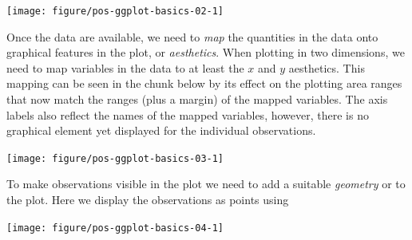 \documentclass[krantz2]{krantz}\usepackage{knitr}%
\begin{document}
\begin{knitrout}\footnotesize
{}\color{fgcolor}\begin{kframe}
\begin{alltt}
\hlstd{(} 
\end{alltt}
\end{kframe}

{\centering \texttt{[image: figure/pos-ggplot-basics-02-1]} 

}



\end{knitrout}

Once the data are available, we need to \emph{map} the quantities in the data onto graphical features in the plot, or \emph{aesthetics}. When plotting in two dimensions, we need to map variables in the data to at least the $x$ and $y$ aesthetics. This mapping can be seen in the chunk below by its effect on the plotting area ranges that now match the ranges (plus a margin) of the mapped variables. The axis labels also reflect the names of the mapped variables, however, there is no graphical element yet displayed for the individual observations.

\begin{knitrout}\footnotesize
{}\color{fgcolor}\begin{kframe}
\begin{alltt}
\hlstd{(} 
       \hlstd{(}   
\end{alltt}
\end{kframe}

{\centering \texttt{[image: figure/pos-ggplot-basics-03-1]} 

}



\end{knitrout}

To make observations visible in the plot we need to add a suitable \emph{geometry} or  to the plot. Here we display the observations as points using 

\begin{knitrout}\footnotesize
{}\color{fgcolor}\begin{kframe}
\begin{alltt}
\hlstd{(} 
       \hlstd{(}    \hlopt{+}
  \hlstd{()}
\end{alltt}
\end{kframe}

{\centering \texttt{[image: figure/pos-ggplot-basics-04-1]} 

}



\end{knitrout}
\end{document}
